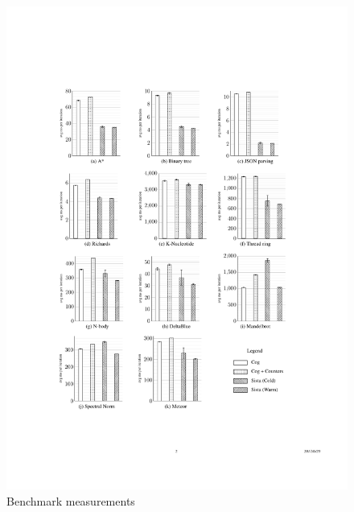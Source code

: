 \documentclass[a4paper,12pt,twoside]{../includes/ThesisStyle}
\begin{document}
\begin{figure}[p]
    \begin{center}
        \includegraphics[width=\linewidth]{Bench}
        \caption{Benchmark measurements}
        \label{fig:measure}
    \end{center}
\end{figure}
\end{document}
